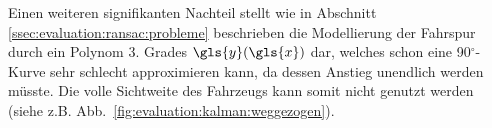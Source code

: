 Einen weiteren signifikanten Nachteil stellt wie in Abschnitt \ref{ssec:evaluation:ransac:probleme} beschrieben die Modellierung der Fahrspur durch ein Polynom 3. Grades \(\gls{y}(\gls{x})\) dar, welches schon eine 90\(^\circ\)-Kurve sehr schlecht approximieren kann, da dessen Anstieg unendlich werden müsste. Die volle Sichtweite des Fahrzeugs kann somit nicht genutzt werden (siehe z.B. Abb.~\ref{fig:evaluation:kalman:weggezogen}).



